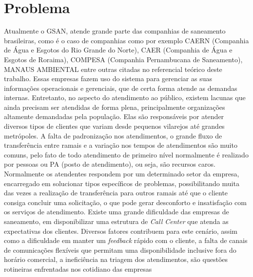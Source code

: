 \section*{Problema}

Atualmente o GSAN, atende grande parte das companhias de saneamento brasileiras, como é o caso de companhias como por exemplo CAERN (Companhia de Água e Esgotos do Rio Grande do Norte), CAER (Companhia de Água e Esgotos de Roraima), COMPESA (Companhia Pernambucana de Saneamento), MANAUS AMBIENTAL entre outras citadas no referencial teórico deste trabalho. Essas empresas fazem uso do sistema para gerenciar as suas informações operacionais e gerenciais, que de certa forma atende as demandas internas. Entretanto, no aspecto do atendimento ao público, existem lacunas que ainda precisam ser atendidas de forma plena, principalmente organizações altamente demandadas pela população. Elas são responsáveis por atender diversos tipos de clientes que variam desde pequenos vilarejos até grandes metrópoles.
A falta de padronização nos atendimentos, o grande fluxo de transferência entre ramais e a variação nos tempos de atendimentos são muito comuns, pelo fato de todo atendimento de primeiro nível normalmente é realizado por pessoas ou PA (posto de atendimento), ou seja, são recursos caros. Normalmente os atendentes respondem por um determinado setor da empresa, encarregado em solucionar tipos específicos de problemas, possibilitando muita das vezes a realização de transferência para outros ramais até que o cliente consiga concluir uma solicitação, o que pode gerar desconforto e insatisfação com os serviços de atendimento.	
Existe uma grande dificuldade das empresas de saneamento, em disponibilizar uma estrutura de \textit{Call Center} que atenda as expectativas dos clientes. Diversos fatores contribuem para este cenário, assim como a dificuldade em manter um \textit{feedback} rápido com o cliente, a falta de canais de comunicações flexíveis que permitam uma disponibilidade inclusive fora do horário comercial, a ineficiência na triagem dos atendimentos, são questões rotineiras enfrentadas nos cotidiano das empresas
